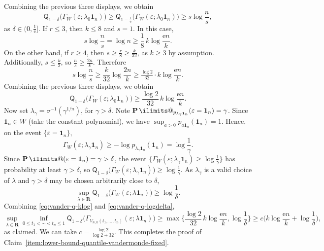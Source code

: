 \documentclass[11pt, letterpaper, hidelinks]{article}
\makeatletter
\newcommand{\R}{\mathbf R}
\newcommand{\e}{\mathrm{e}}
\newcommand{\1}{\mathbf 1}
\newcommand{\eps}{\varepsilon}
\renewcommand{\ge}{\geqslant}
\renewcommand{\leq}{\leqslant}
\renewcommand{\geq}{\geqslant}
\renewcommand{\P}{\operatorname*{\mathbf{P}}\ilimits@}
\theoremstyle{plain}
\theoremstyle{definition}
\newcommand{\defn}{=}
\newcommand{\Quant}[1]{\mathsf{Q}_{#1}}
\makeatother
\begin{document}
Combining the previous three displays, we obtain 
\[
\Quant{1-\delta}\Big(\Gamma_W(\eps;\lambda_0\1_n)\Big)
\geq
\Quant{1-\tfrac{1}{\e}}\Big(\Gamma_W(\eps;\lambda_0\1_n)\Big)
\geq 
s\log\frac{n}{s},
\]
as $\delta \in (0, \tfrac{1}{\e}]$.
If $r\leq 3$, then $k \leq 8$ and $s=1$. In this case, 
\[
s\log\frac{n}{s} =
\log n \geq  \frac{1}{8}\, k\log\frac{\e n}{k}.
\]
On the other hand, if $r\geq 4$, then $s \geq \tfrac{r}{8} \geq \tfrac{k}{32}$, 
as $k \geq 3$ by assumption.
Additionally, $s \leq \tfrac{k}{2}$, so $\tfrac{n}{s} \geq \tfrac{2n}{k}$. 
Therefore
\[
s\log\frac{n}{s} \geq \frac{k}{32} \log\frac{2n}{k} \geq \tfrac{\log 2}{32} \cdot k\log\frac{\e n}{k}.
\]
Combining the previous three displays, we obtain 
\begin{equation}
\label{eq:vander-q-klog}
\Quant{1-\delta}\Big(\Gamma_W(\eps;\lambda_0\1_n)\Big)
\geq \frac{\log 2}{32}\,k\log\frac{\e n}{k}.
\end{equation}
Now set $\lambda_\gamma \defn \sigma^{-1}(\gamma^{1/n})$, 
for $\gamma > \delta$. Note $\P_{p_{\lambda_\gamma\1_n}}(\eps=\1_n)= \gamma$. 
Since $\1_n\in W$ (take the constant polynomial), we have
$\sup_{a>0} p_{a\1_n}(\1_n)=1$.
Hence, on the event $\{\eps=\1_n\}$,
\[
\Gamma_W(\eps;\lambda_\gamma\1_n)
\ge -\log p_{\lambda_\gamma\1_n}(\1_n)
= \log\frac{1}{\gamma}.
\]
Since $\P(\eps=\1_n)=\gamma>\delta$, the event $\{\Gamma_W(\eps;\lambda_\gamma\1_n) \geq \log\frac{1}{\gamma}\}$ has probability at least $\gamma > \delta$, so $\Quant{1-\delta}\bigl(\Gamma_W(\eps;\lambda_\gamma\1_n)\bigr) \geq \log\frac{1}{\gamma}$. As $\lambda_\gamma$ is a valid choice of $\lambda$ and $\gamma>\delta$ may be chosen arbitrarily close to $\delta$,
\begin{equation}
\label{eq:vander-q-logdelta}
\sup_{\lambda \in \R}\Quant{1-\delta}\bigl(\Gamma_W(\eps;\lambda\1_n)\bigr)
\geq \log\frac{1}{\delta}.
\end{equation}
Combining \eqref{eq:vander-q-klog} and \eqref{eq:vander-q-logdelta},
\[
\sup_{\lambda\in\R}
\inf_{0\leq t_1<\cdots<t_n\leq1}
\Quant{1-\delta}\Big(\Gamma_{V_{n,k}(t_1,\dots,t_n)}(\eps;\lambda\1_n)\Big)
\geq
\max\Big\{
\frac{\log 2}{32}\,k\log\frac{\e n}{k}, \log\frac{1}{\delta}
\Big\}
\geq
c
\Big(k\log\frac{\e n}{k}+\log\frac{1}{\delta}\Big),
\]
as claimed. We can take $c = \tfrac{\log 2}{\log 2 + 32}$. This completes the proof of Claim~\ref{item:lower-bound-quantile-vandermonde-fixed}.
\end{document}
